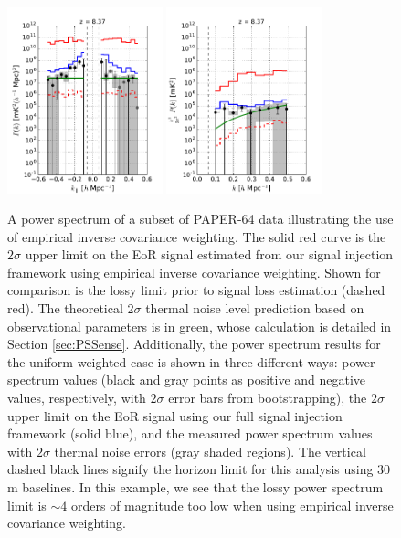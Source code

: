 \documentclass[preprint2,numberedappendix,tighten]{aastex6}  %
\begin{document}
\begin{figure}
	\centering
	\includegraphics[width=0.4\textwidth]{plots/ps1_data.pdf}
	\includegraphics[width=0.4\textwidth]{plots/ps2_data.pdf}
	\caption{A power spectrum of a subset of PAPER-64 data illustrating the use of empirical inverse covariance weighting. The solid red curve is the $2\sigma$ upper limit on the EoR signal estimated from our signal injection framework using empirical inverse covariance weighting. Shown for comparison is the lossy limit prior to signal loss estimation (dashed red). The theoretical $2\sigma$ thermal noise level prediction based on observational parameters is in green, whose calculation is detailed in Section \ref{sec:PSSense}. Additionally, the power spectrum results for the uniform weighted case is shown in three different ways: power spectrum values (black and gray points as positive and negative values, respectively, with $2\sigma$ error bars from bootstrapping), the $2\sigma$ upper limit on the EoR signal using our full signal injection framework (solid blue), and the measured power spectrum values with $2\sigma$ thermal noise errors (gray shaded regions). The vertical dashed black lines signify the horizon limit for this analysis using $30$\,m baselines. In this example, we see that the lossy power spectrum limit is $\sim 4$ orders of magnitude too low when using empirical inverse covariance weighting.}
\label{fig:ps2_data}
\end{figure}
\end{document}
